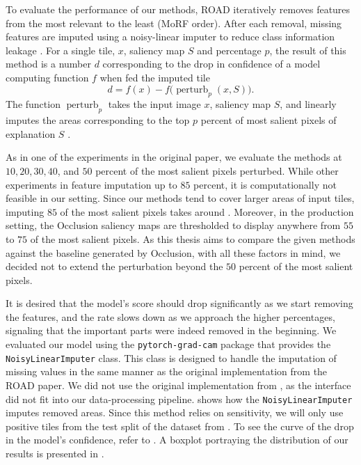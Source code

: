 To evaluate the performance of our methods, ROAD iteratively removes features from the most relevant to the least (MoRF order).
After each removal, missing features are imputed using a noisy-linear imputer to reduce class information leakage \cite{road}.
For a single tile, $x$, saliency map $S$ and percentage $p$, the result of this method is a number $d$ corresponding to the drop in confidence of a model computing function $f$ when fed the imputed tile
\begin{equation}
    d = f(x) - f\bigl(\operatorname{perturb}_p(x, S)\bigr).
\end{equation}
The function $\operatorname{perturb}_p$ takes the input image $x$, saliency map $S$, and linearly imputes the areas corresponding to the top $p$ percent of most salient pixels of explanation $S$ \cite{road}.

As in one of the experiments in the original paper, we evaluate the methods at $10, 20, 30, 40$, and $50$ percent of the most salient pixels perturbed.
While other experiments in \cite{road} feature imputation up to $85$ percent, it is computationally not feasible in our setting.
Since our methods tend to cover larger areas of input tiles, imputing $85$ of the most salient pixels takes around .
Moreover, in the production setting, the Occlusion saliency maps are thresholded to display anywhere from $55$ to $75$ of the most salient pixels.
As this thesis aims to compare the given methods against the baseline generated by Occlusion, with all these factors in mind, we decided not to extend the perturbation beyond the $50$ percent of the most salient pixels.

It is desired that the model's score should drop significantly as we start removing the features, and the rate slows down as we approach the higher percentages, signaling that the important parts were indeed removed in the beginning.
We evaluated our model using the \texttt{pytorch-grad-cam} package that provides the \texttt{NoisyLinearImputer} class.
This class is designed to handle the imputation of missing values in the same manner as the original implementation from the ROAD paper.
We did not use the original implementation from \cite{road}, as the interface did not fit into our data-processing pipeline.
 shows how the \texttt{NoisyLinearImputer} imputes removed areas.
Since this method relies on sensitivity, we will only use positive tiles from the test split of the dataset from .
To see the curve of the drop in the model's confidence, refer to .
A boxplot portraying the distribution of our results is presented in .

